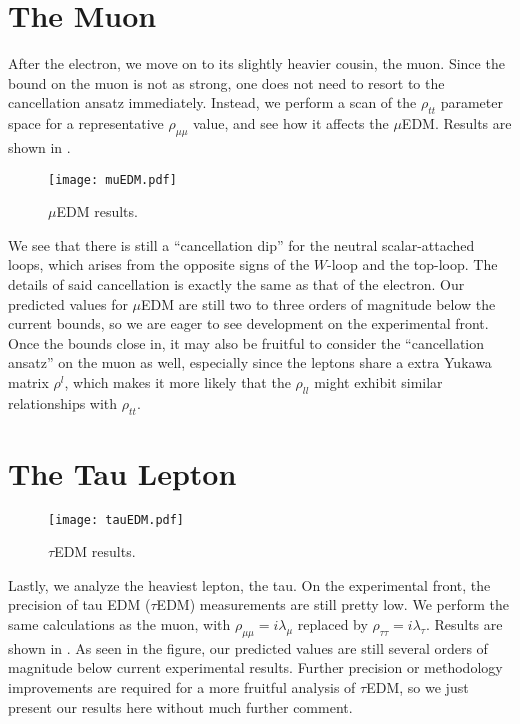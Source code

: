 \section{The Muon}
After the electron, we move on to its slightly heavier cousin, the muon. 
Since the bound on the muon is not as strong, one does not need to resort to the cancellation ansatz immediately.
Instead, we perform a scan of the \(\rho_{tt} \) parameter space for a representative \(\rho_{\mu\mu} \) value, and see how it affects the \(\mu \)EDM.
Results are shown in .

\begin{figure}[p]
    \centering
    \texttt{[image: muEDM.pdf]}
    \caption{\(\mu \)EDM results.}
    \label{fig:muEDM}
\end{figure}

We see that there is still a ``cancellation dip'' for the neutral scalar-attached loops, which arises from the opposite signs of the \(W \)-loop and the top-loop.
The details of said cancellation is exactly the same as that of the electron.
Our predicted values for \(\mu \)EDM are still two to three orders of magnitude below the current bounds, so we are eager to see development on the experimental front.
Once the bounds close in, it may also be fruitful to consider the ``cancellation ansatz'' on the muon as well, especially since the leptons share a extra Yukawa matrix \(\rho^{l} \),
which makes it more likely that the \(\rho_{ll} \) might exhibit similar relationships with \(\rho_{tt} \).

\section{The Tau Lepton}
\begin{figure}[p]
    \centering
    \texttt{[image: tauEDM.pdf]}
    \caption{\(\tau \)EDM results.}
    \label{fig:tauEDM}
\end{figure}
Lastly, we analyze the heaviest lepton, the tau. 
On the experimental front, the precision of tau EDM (\(\tau \)EDM) measurements are still pretty low.
We perform the same calculations as the muon, with \(\rho_{\mu\mu} = i\lambda_{\mu} \) replaced by \(\rho_{\tau\tau} = i\lambda_{\tau} \).
Results are shown in .
As seen in the figure, our predicted values are still several orders of magnitude below current experimental results.
Further precision or methodology improvements are required for a more fruitful analysis of \(\tau \)EDM, so we just present our results here without much further comment.

